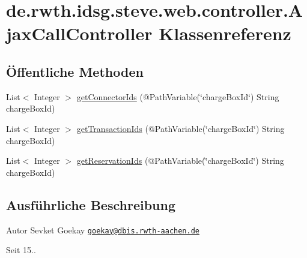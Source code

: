 \hypertarget{classde_1_1rwth_1_1idsg_1_1steve_1_1web_1_1controller_1_1_ajax_call_controller}{\section{de.\-rwth.\-idsg.\-steve.\-web.\-controller.\-Ajax\-Call\-Controller Klassenreferenz}
\label{classde_1_1rwth_1_1idsg_1_1steve_1_1web_1_1controller_1_1_ajax_call_controller}
}
\subsection*{Öffentliche Methoden}
\begin{DoxyCompactItemize}
\item 
List$<$ Integer $>$ \hyperlink{classde_1_1rwth_1_1idsg_1_1steve_1_1web_1_1controller_1_1_ajax_call_controller_a09f444d52215fc760202c542a5612702}{get\-Connector\-Ids} (@Path\-Variable(\char`\"{}charge\-Box\-Id\char`\"{}) String charge\-Box\-Id)
\item 
List$<$ Integer $>$ \hyperlink{classde_1_1rwth_1_1idsg_1_1steve_1_1web_1_1controller_1_1_ajax_call_controller_a918ce2fa237aa28796ad8f18d3a7e8b5}{get\-Transaction\-Ids} (@Path\-Variable(\char`\"{}charge\-Box\-Id\char`\"{}) String charge\-Box\-Id)
\item 
List$<$ Integer $>$ \hyperlink{classde_1_1rwth_1_1idsg_1_1steve_1_1web_1_1controller_1_1_ajax_call_controller_acf3eb88059e229d7623fe6c3b3895cad}{get\-Reservation\-Ids} (@Path\-Variable(\char`\"{}charge\-Box\-Id\char`\"{}) String charge\-Box\-Id)
\end{DoxyCompactItemize}


\subsection{Ausführliche Beschreibung}
\begin{DoxyAuthor}{Autor}
Sevket Goekay \href{mailto:goekay@dbis.rwth-aachen.de}{\tt goekay@dbis.\-rwth-\/aachen.\-de} 
\end{DoxyAuthor}
\begin{DoxySince}{Seit}
15.. 
\end{DoxySince}


